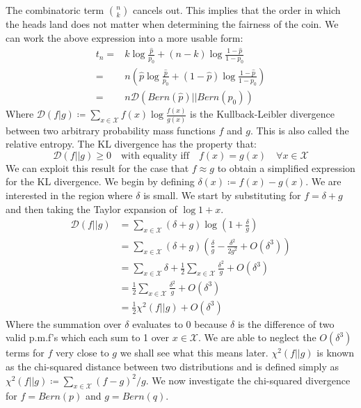 \documentclass[]{article}
\newcommand{\Xcal}{\mathcal{X}}
\newcommand{\kl}{\mathcal{D}}
\begin{document}
%
The combinatoric term $\binom{n}{k}$ cancels out. This implies that the order in which the heads land does not matter when determining the fairness of the coin. We can work the above expression into a more usable form:
%
\begin{align}
t_n =& k \log \frac{\hat{p}}{p_0} + (n-k) \log \frac{1 - \hat{p}}{1 - p_0} \nonumber \\
=& n \left( \hat{p} \log \frac{\hat{p}}{p_0} + (1-\hat{p}) \log \frac{1 - \hat{p}}{1-p_0} \right) \nonumber \\
=& n \kl \left(Bern(\hat{p}) || Bern(p_0) \right)
\end{align}
%
Where $\kl(f | g) \coloneqq \sum_{x \in \Xcal} f(x) \log \frac{f(x)}{g(x)}$ is the Kullback-Leibler divergence between two arbitrary probability mass functions $f$ and $g$. This is also called the relative entropy. The KL divergence has the property that:
%
\begin{equation}
\kl (f || g) \geq 0 \quad \text{with equality iff} \quad f(x) = g(x) \quad \forall x \in \Xcal
\end{equation}
%
We can exploit this result for the case that $f \approx g$ to obtain a simplified expression for the KL divergence. We begin by defining $\delta (x) \coloneqq f(x) - g(x)$. We are interested in the region where $\delta$ is small. We start by substituting for $f=\delta + g$ and then taking the Taylor expansion of $\log 1+x$.
%
\begin{align*}
\kl(f||g) &= \sum_{x \in \Xcal} (\delta + g) \log \left(1 + \frac{\delta}{g} \right) \\
&= \sum_{x \in \Xcal} (\delta + g) \left( \frac{\delta}{g} - \frac{\delta^2}{2g^2} + O(\delta^3) \right) \\
&= \sum_{x \in \Xcal} \delta + \frac{1}{2} \sum_{x \in \Xcal} \frac{\delta^2}{g} + O(\delta^3) \\
&= \frac{1}{2} \sum_{x \in \Xcal} \frac{\delta^2}{g} + O(\delta^3) \\
&= \frac{1}{2} \chi^2(f||g) + O(\delta^3)
\end{align*}
%
Where the summation over $\delta$ evaluates to 0 because $\delta$ is the difference of two valid p.m.f's which each sum to 1 over $x \in \Xcal$. We are able to neglect the $O(\delta^3)$ terms for $f$ very close to $g$ we shall see what this means later. $\chi^2(f||g)$ is known as the chi-squared distance between two distributions and is defined simply as $\chi^2(f||g) \coloneqq \sum_{x \in \Xcal} (f-g)^2/g$. We now investigate the chi-squared divergence for $f = Bern(p)$ and $g = Bern(q)$.
\end{document}
